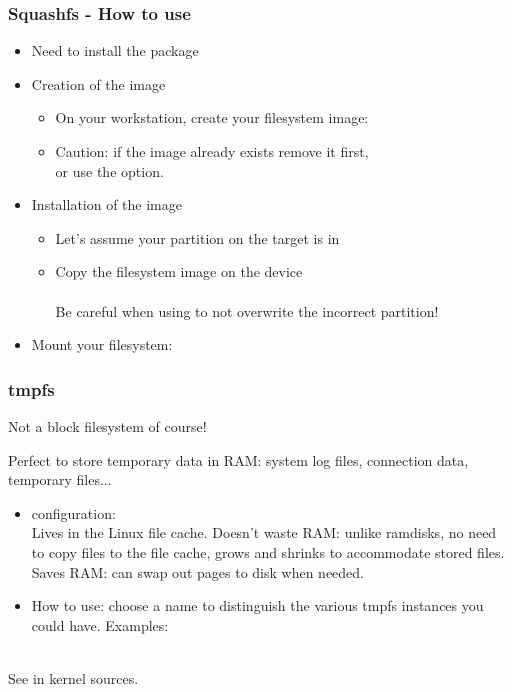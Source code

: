 \begin{frame}
  \frametitle{Squashfs - How to use}
  \begin{itemize}
  \item Need to install the  package
  \item Creation of the image
    \begin{itemize}
    \item On your workstation, create your filesystem image:\\
    \item Caution: if the image already exists remove it first,\\
      or use the  option.
    \end{itemize}
  \item Installation of the image
    \begin{itemize}
    \item Let's assume your partition on the target is in
    \item Copy the filesystem image on the device\\
      \\
      Be careful when using  to not overwrite the incorrect
      partition!
    \end{itemize}
  \item Mount your filesystem:\\
  \end{itemize}
\end{frame}

\begin{frame}
  \frametitle{tmpfs}

  Not a block filesystem of course!

  Perfect to store temporary data in RAM: system log files, connection
  data, temporary files...

  \begin{itemize}
  \item {} configuration: \\
    Lives in the Linux file cache. Doesn't waste RAM: unlike ramdisks, no need
    to copy files to the file cache, grows and shrinks to accommodate stored files.
    Saves RAM: can swap out pages to disk when needed.
  \item How to use: choose a name to distinguish the various tmpfs
    instances you could have. Examples:\\
    \\
  \end{itemize}
  See  in kernel sources.
\end{frame}

